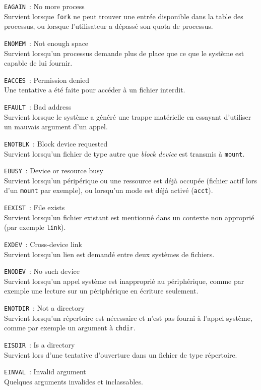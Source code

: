 \documentclass [twoside] {report}
\begin{document}
{\tt EAGAIN}~: No more process \\
Survient lorsque {\tt fork} ne peut trouver une
entrée disponible dans la table des processus, ou
lorsque l'utilisateur a dépassé son quota de
processus.

{\tt ENOMEM}~: Not enough space \\
Survient lorsqu'un processus demande plus de
place que ce que le système est capable de lui
fournir.

{\tt EACCES}~: Permission denied \\
Une tentative a été faite pour accéder à un
fichier interdit.

{\tt EFAULT}~: Bad address \\
Survient lorsque le système a généré une trappe matérielle en
essayant d'utiliser un mauvais argument d'un
appel.

{\tt ENOTBLK}~: Block device requested \\
Survient lorsqu'un fichier de type autre que
{\it block device} est transmis à {\tt mount}.

{\tt EBUSY}~: Device or resource busy \\
Survient lorsqu'un péripérique ou une ressource
est déjà occupée (fichier actif lors d'un
{\tt mount} par exemple), ou lorsqu'un mode est déjà
activé ({\tt acct}).

{\tt EEXIST}~: File exists \\
Survient lorsqu'un fichier existant est mentionné
dans un contexte non approprié (par exemple
{\tt link}).

{\tt EXDEV}~: Cross-device link \\
Survient lorsqu'un lien est demandé entre deux
systèmes de fichiers.

{\tt ENODEV}~: No such device \\
Survient lorsqu'un appel système est inapproprié
au périphérique, comme par exemple une lecture sur
un périphérique en écriture seulement.

{\tt ENOTDIR}~: Not a directory \\
Survient lorsqu'un répertoire est nécessaire et
n'est pas fourni à l'appel système, comme par
exemple un argument à {\tt chdir}.

{\tt EISDIR}~: Is a directory \\
Survient lors d'une tentative d'ouverture dans un
fichier de type répertoire.

{\tt EINVAL}~: Invalid argument \\
Quelques arguments invalides et inclassables.
\end{document}

